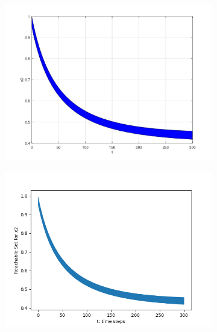 \documentclass[EPiC]{easychair}
\begin{document}
\begin{figure}[h]
    \begin{subfigure}{0.5\textwidth}
    \centering
    \includegraphics[width=\textwidth]{SapoFigures/LV/SapoLV_X2.jpg}
    \end{subfigure}
    \begin{subfigure}{0.6\textwidth}
    \centering
    \includegraphics[width=\textwidth]{SapoFigures/LV/KaaLV_X2.png}
    \end{subfigure}
    

\end{figure}
\end{document}
